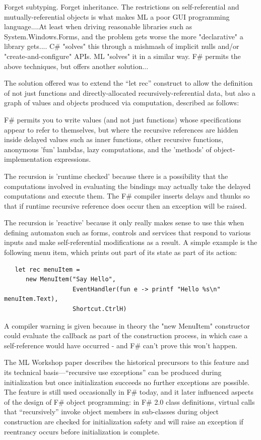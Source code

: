 \documentclass[acmsmall]{acmart}\settopmatter{}
\begin{document}
\begin{verbquote}
Forget subtyping.  Forget inheritance.   The restrictions on self-referential and mutually-referential objects is what makes ML a poor GUI programming language....At least when driving reasonable libraries such as System.Windows.Forms, and the problem gets worse the more "declarative" a library gets.... C# "solves" this through a mishmash of implicit nulls and/or "create-and-configure" APIs.   ML "solves" it in a similar way.  F# permits the above techniques, but offers another solution... 
\end{verbquote}
The solution offered was to extend the “let rec” construct to allow the definition of not just functions and directly-allocated recursively-referential data, but also a graph of values and objects produced via computation, described as follows:
\begin{verbquote}
F# permits you to write values (and not just functions) whose specifications appear to refer to themselves, but where the recursive references are hidden inside delayed values such as inner functions, other recursive functions, anonymous 'fun' lambdas, lazy computations, and the 'methods' of object-implementation expressions. 

The recursion is 'runtime checked' because there is a possibility that the computations involved in evaluating the bindings may actually take the delayed computations and execute them. The F# compiler inserts delays and thunks so that if runtime recursive reference does occur then an exception will be raised.

The recursion is 'reactive' because it only really makes sense to use this when defining automaton such as forms, controls and services that respond to various inputs and make self-referential modifications as a result. A simple example is the following menu item, which prints out part of its state as part of its action:
\end{verbquote}
\begin{verbatim}
   let rec menuItem = 
      new MenuItem("Say Hello", 
                   EventHandler(fun e -> printf "Hello %s\n" menuItem.Text), 
                   Shortcut.CtrlH)
\end{verbatim}
\begin{verbquote}
A compiler warning is given because in theory the "new MenuItem" constructor could evaluate the callback as part of the construction process, in which case a self-reference would have occurred - and F# can't prove this won't happen. 
\end{verbquote}
The ML Workshop paper describes the historical precursors to this feature and its technical basis---“recursive use exceptions” can be produced during
initialization but once initialization succeeds no further exceptions are possible. The feature is still used occasionally in F\# today, and it later influenced
aspects of the design of F\# object programming: in F\# 2.0 class definitions, virtual calls that “recursively” invoke object members in sub-classes during
object construction are checked for initialization safety and will raise an exception if reentrancy occurs before initialization is complete. 
\end{document}
